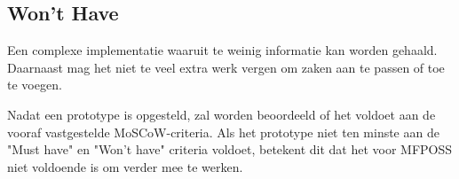 \subsection{Won't Have}
Een complexe implementatie waaruit te weinig informatie kan worden gehaald. Daarnaast mag het niet te veel extra werk vergen om zaken aan te passen of toe te voegen.

Nadat een prototype is opgesteld, zal worden beoordeeld of het voldoet aan de vooraf vastgestelde MoSCoW-criteria. Als het prototype niet ten minste aan de "Must have" en "Won't have" criteria voldoet, betekent dit dat het voor MFPOSS niet voldoende is om verder mee te werken.
